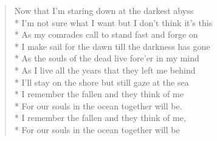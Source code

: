 \documentclass[9pt,twoside]{extarticle}
\newenvironment{xverse}{
	\begin{verse}
	\fontsize{8.5}{10.5}\selectfont
	}
	{
	\end{verse}
	\penalty 0
}
\begin{document}
\begin{xverse}
Now that I’m staring down at the darkest abyss \\*
I’m not sure what I want but I don’t think it’s this \\*
As my comrades call to stand fast and forge on \\*
I make sail for the dawn till the darkness has gone \\*
As the souls of the dead live fore’er in my mind \\*
As I live all the years that they left me behind \\*
I’ll stay on the shore but still gaze at the sea \\*
I remember the fallen and they think of me \\*
For our souls in the ocean together will be. \\*
I remember the fallen and they think of me, \\*
For our souls in the ocean together will be
\end{xverse}
\end{document}
